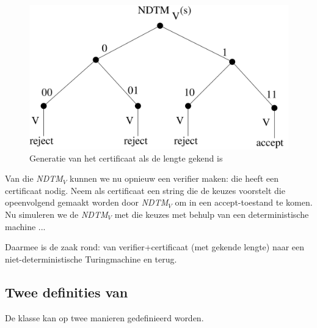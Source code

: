 \begin{figure}[h]
\begin{center}
\includegraphics[height=0.2\textheight,keepaspectratio]{nondetverifier}
\caption{Generatie van het certificaat als de lengte gekend
is}\label{nondetverifier}
\end{center}
\end{figure}

Van die {\em NDTM$_V$} kunnen we nu opnieuw een verifier maken: die heeft
een certificaat nodig. Neem als certificaat een string die de keuzes
voorstelt die opeenvolgend gemaakt worden door {\em NDTM$_V$} om in een
accept-toestand te komen. Nu simuleren we de {\em NDTM$_V$} met die keuzes
met behulp van een deterministische machine ...

Daarmee is de zaak rond: van verifier+certificaat (met gekende lengte)
naar een niet-deterministische Turingmachine en terug.



\subsection{Twee definities van \NP}

De klasse \NP kan op twee manieren gedefinieerd worden.



